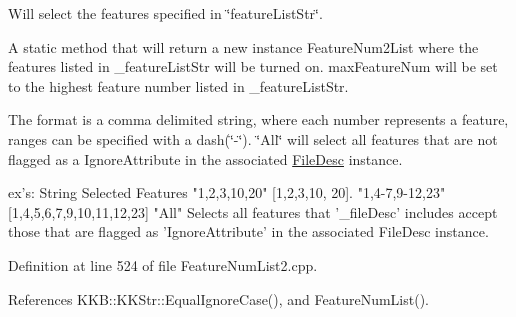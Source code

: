Will select the features specified in \char`\"{}feature\+List\+Str\char`\"{}. 

A static method that will return a new instance \textquotesingle{}Feature\+Num2\+List\textquotesingle{} where the features listed in \textquotesingle{}\+\_\+feature\+List\+Str\textquotesingle{} will be turned on. \textquotesingle{}max\+Feature\+Num\textquotesingle{} will be set to the highest feature number listed in \textquotesingle{}\+\_\+feature\+List\+Str\textquotesingle{}.

The format is a comma delimited string, where each number represents a feature, ranges can be specified with a dash(\char`\"{}-\/\char`\"{}). \char`\"{}\+All\char`\"{} will select all features that are not flagged as a \textquotesingle{}Ignore\+Attribute\textquotesingle{} in the associated \hyperlink{class_k_k_m_l_l_1_1_file_desc}{File\+Desc} instance. 
\begin{DoxyCode}
ex\textcolor{stringliteral}{'s:   String          Selected Features}
\textcolor{stringliteral}{       "1,2,3,10,20"    [1,2,3,10, 20].}
\textcolor{stringliteral}{       "1,4-7,9-12,23"  [1,4,5,6,7,9,10,11,12,23]}
\textcolor{stringliteral}{       "All"            Selects all features that '}\_fileDesc\textcolor{stringliteral}{' includes accept those that are}
\textcolor{stringliteral}{                        flagged as '}IgnoreAttribute\textcolor{stringliteral}{' in the associated FileDesc instance.}
\end{DoxyCode}
 

Definition at line 524 of file Feature\+Num\+List2.\+cpp.



References K\+K\+B\+::\+K\+K\+Str\+::\+Equal\+Ignore\+Case(), and Feature\+Num\+List().


